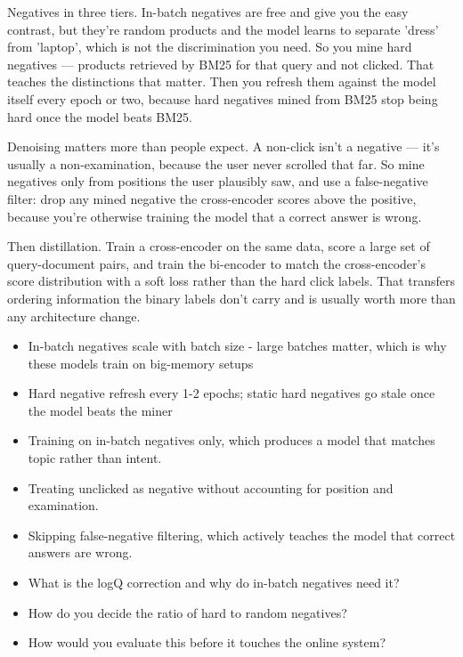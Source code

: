 \documentclass[10pt,twoside]{book}
\newcommand{\lab}[1]{\par\vspace{5pt}\noindent{\sffamily\footnotesize\bfseries\color{accent}#1}\par\vspace{1pt}}
\newcommand{\flab}[1]{\par\vspace{5pt}\noindent{\sffamily\footnotesize\bfseries\color{flag}#1}\par\vspace{1pt}}
\begin{document}
Negatives in three tiers. In-batch negatives are free and give you the easy contrast, but they're random products and the model learns to separate 'dress' from 'laptop', which is not the discrimination you need. So you mine hard negatives --- products retrieved by BM25 for that query and not clicked. That teaches the distinctions that matter. Then you refresh them against the model itself every epoch or two, because hard negatives mined from BM25 stop being hard once the model beats BM25.\par\vspace{3pt}
Denoising matters more than people expect. A non-click isn't a negative --- it's usually a non-examination, because the user never scrolled that far. So mine negatives only from positions the user plausibly saw, and use a false-negative filter: drop any mined negative the cross-encoder scores above the positive, because you're otherwise training the model that a correct answer is wrong.\par\vspace{3pt}
Then distillation. Train a cross-encoder on the same data, score a large set of query-document pairs, and train the bi-encoder to match the cross-encoder's score distribution with a soft loss rather than the hard click labels. That transfers ordering information the binary labels don't carry and is usually worth more than any architecture change.\par\vspace{3pt}
\lab{Numbers}
\begin{itemize}
\item In-batch negatives scale with batch size - large batches matter, which is why these models train on big-memory setups
\item Hard negative refresh every 1-2 epochs; static hard negatives go stale once the model beats the miner
\end{itemize}
\flab{Loses the signal}
\begin{itemize}
\item Training on in-batch negatives only, which produces a model that matches topic rather than intent.
\item Treating unclicked as negative without accounting for position and examination.
\item Skipping false-negative filtering, which actively teaches the model that correct answers are wrong.
\end{itemize}
\lab{Then they ask}
\begin{itemize}
\item What is the logQ correction and why do in-batch negatives need it?
\item How do you decide the ratio of hard to random negatives?
\item How would you evaluate this before it touches the online system?
\end{itemize}
\end{document}
